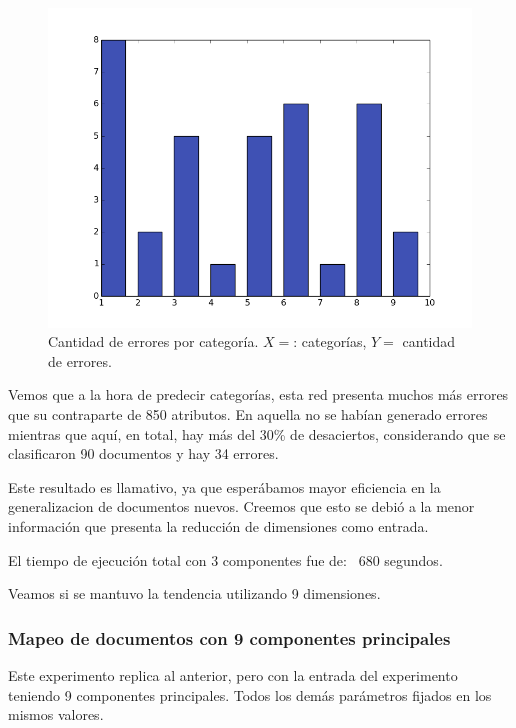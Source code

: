 \begin{figure}[!htbp]
  \begin{center}
    \includegraphics[scale=0.45]{../img/validation_1000ep_3en_sigma7_faseord750.png}
  \caption{Cantidad de errores por categoría. $X=$: categorías, $Y=$ cantidad de errores.}
  \end{center}
\end{figure}

Vemos que a la hora de predecir categorías, esta red presenta muchos más errores que su contraparte de 850 atributos. En aquella no se habían generado errores mientras que aquí, en total, hay más del 30\% de desaciertos, considerando que se clasificaron 90 documentos y hay 34 errores. 

Este resultado es llamativo, ya que esperábamos mayor eficiencia en la generalizacion de documentos nuevos. Creemos que esto se debió a la menor información que presenta la reducción de dimensiones como entrada.

El tiempo de ejecución total con 3 componentes fue de: ~680 segundos.

Veamos si se mantuvo la tendencia utilizando 9 dimensiones.

\subsubsection{Mapeo de documentos con 9 componentes principales}

Este experimento replica al anterior, pero con la entrada del experimento teniendo 9 componentes principales. Todos los demás parámetros fijados en los mismos valores.

